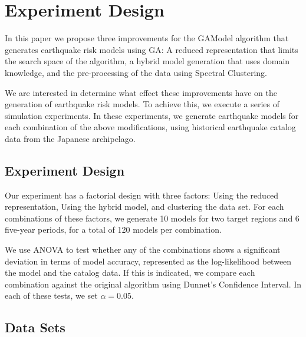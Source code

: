 


\section{Experiment Design}
\label{sec:experiment}

In this paper we propose three improvements for the GAModel algorithm
that generates earthquake risk models using GA: A reduced
representation that limits the search space of the algorithm, a hybrid
model generation that uses domain knowledge, and the pre-processing of
the data using Spectral Clustering.

We are interested in determine what effect these improvements have on
the generation of earthquake risk models. To achieve this, we execute
a series of simulation experiments. In these experiments, we generate
earthquake models for each combination of the above modifications,
using historical earthquake catalog data from the Japanese
archipelago.

\subsection{Experiment Design}


Our experiment has a factorial design with three factors: Using the
reduced representation, Using the hybrid model, and clustering the
data set. For each combinations of these factors, we generate 10 models
for two target regions and 6 five-year periods, for a total of 120
models per combination.

We use ANOVA to test whether any of the combinations shows a
significant deviation in terms of model accuracy, represented as the
log-likelihood between the model and the catalog data. If this is
indicated, we compare each combination against the original algorithm
using Dunnet's Confidence Interval. In each of these tests, we set
$\alpha = 0.05$.

\subsection{Data Sets}

